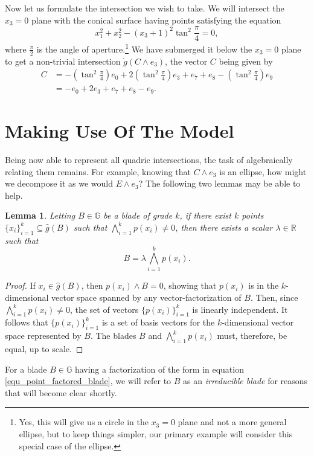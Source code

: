\documentclass{birkjour}
\newtheorem{lem}[thm]{Lemma}
\theoremstyle{definition}
\theoremstyle{remark}
\numberwithin{equation}{section}
\newcommand{\R}{\mathbb{R}}
\newcommand{\G}{\mathbb{G}}
\newcommand{\gd}{\dot{g}}
\newcommand{\gh}{\hat{g}}
\begin{document}
Now let us formulate the intersection we wish to take.  We will
intersect the $x_3=0$ plane with the conical surface having points satisfying the equation
\begin{equation}\label{equ_conical_surface}
x_1^2+x_2^2 - (x_3+1)^2\tan^2\frac{\pi}{4} = 0,
\end{equation}
where $\frac{\pi}{2}$ is the angle of aperture.\footnote{Yes, this will give
us a circle in the $x_3=0$ plane and not a more general ellipse, but to keep things
simpler, our primary example will consider this special case of the ellipse.}  We have submerged it
below the $x_3=0$ plane to get a non-trivial intersection $\gd(C\wedge e_3)$,
the vector $C$ being given by
\begin{align*}
C &= -\left(\tan^2\frac{\pi}{4}\right)e_0 + 2\left(\tan^2\frac{\pi}{4}\right)e_3 + e_7 + e_8 - \left(\tan^2\frac{\pi}{4}\right)e_9 \\
 &= -e_0 + 2e_3 + e_7 + e_8 - e_9.
\end{align*}

\section{Making Use Of The Model}

Being now able to represent all quadric intersections, the task of
algebraically relating them remains.  For example, knowing that
$C\wedge e_3$ is an ellipse, how might we decompose it
as we would $E\wedge e_3$?  The following two lemmas may be able to help.
\begin{lem}\label{lma_point_factored_blade}
Letting $B\in\G$ be a blade of grade $k$, if there exist $k$ points $\{x_i\}_{i=1}^k\subseteq\gh(B)$
such that $\bigwedge_{i=1}^k p(x_i)\neq 0$, then there exists a scalar $\lambda\in\R$
such that
\begin{equation}\label{equ_point_factored_blade}
B = \lambda\bigwedge_{i=1}^k p(x_i).
\end{equation}
\end{lem}
\begin{proof}
If $x_i\in\gh(B)$, then $p(x_i)\wedge B=0$, showing that $p(x_i)$ is in the $k$-dimensional vector
space spanned by any vector-factorization of $B$.
Then, since $\bigwedge_{i=1}^k p(x_i)\neq 0$,
the set of vectors $\{p(x_i)\}_{i=1}^k$ is linearly independent.  It follows that
$\{p(x_i)\}_{i=1}^k$ is a set of basis vectors for the $k$-dimensional vector space represented by $B$.
The blades $B$ and $\bigwedge_{i=1}^k p(x_i)$
must, therefore, be equal, up to scale.
\end{proof}
For a blade $B\in\G$ having a factorization of the form in equation \eqref{equ_point_factored_blade},
we will refer to $B$ as an {\it irreducible blade} for reasons that will become clear shortly.
\end{document}
